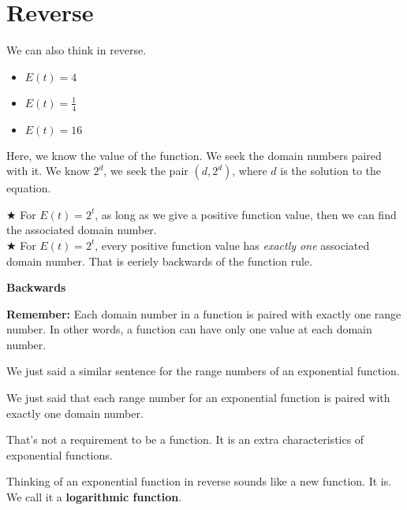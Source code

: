 \documentclass{ximera}
\begin{document}
\section{Reverse}

We can also think in reverse.
\begin{itemize}
\item $E(t) = 4$
\item $E(t) = {\tfrac{1}{4}} $
\item $E(t) = 16 $
\end{itemize}


Here, we know the value of the function.  We seek the domain numbers paired with it. We know $2^d$, we seek the pair $(d, 2^d)$, where $d$ is the solution to the equation.




$\bigstar$ For $E(t) = 2^t$, as long as we give a positive function value, then we can find the associated domain number. \\ 



$\bigstar$ For $E(t) = 2^t$, every positive function value has \textit{exactly one} associated domain number. That is eeriely backwards of the function rule.\\ 



\begin{observation}  \textbf{\textcolor{red!80!black}{Backwards}}

\textbf{Remember:}  Each domain number in a function is paired with exactly one range number.  In other words, a function can have only one value at each domain number. 


We just said a similar sentence for the range numbers of an exponential function.


We just said that each range number for an exponential function is paired with exactly one domain number.

That's not a requirement to be a function.  It is an extra characteristics of exponential functions.



\end{observation}



Thinking of an exponential function in reverse sounds like a new function. It is. We call it a \textbf{\textcolor{purple!85!blue}{logarithmic function}}.
\end{document}
